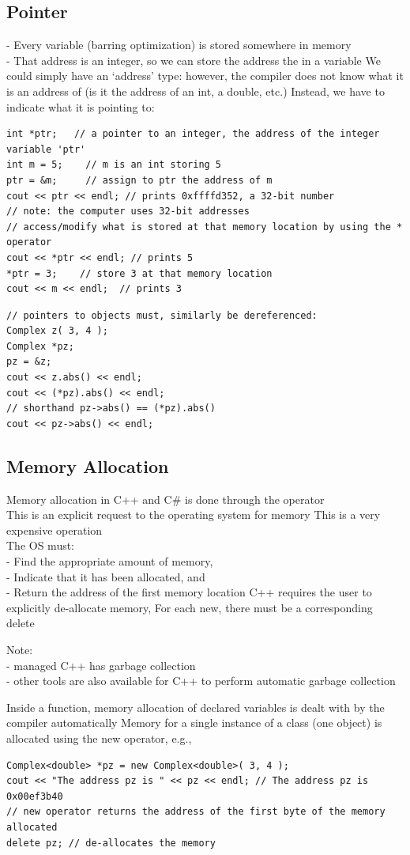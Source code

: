\documentclass[11pt]{article}
\theoremstyle{definition}
\begin{document}
\subsection{Pointer}
- Every variable (barring optimization) is stored somewhere in memory\\
- That address is an integer, so we can store the address the in a variable
\newline
We could simply have an ‘address’ type:  however, the compiler does not know what it is an address of (is it the address of an int, a double, etc.)
Instead, we have to indicate what it is pointing to:
\begin{lstlisting}
int *ptr;   // a pointer to an integer, the address of the integer variable 'ptr'
int m = 5;    // m is an int storing 5
ptr = &m;     // assign to ptr the address of m
cout << ptr << endl; //	prints 0xffffd352, a 32-bit number
// note: the computer uses 32-bit addresses
// access/modify what is stored at that memory location by using the * operator
cout << *ptr << endl; // prints 5
*ptr = 3;    // store 3 at that memory location 
cout << m << endl;  // prints 3
\end{lstlisting}
\begin{lstlisting}
// pointers to objects must, similarly be dereferenced:
Complex z( 3, 4 );
Complex *pz;
pz = &z;
cout << z.abs() << endl;
cout << (*pz).abs() << endl;
// shorthand pz->abs() == (*pz).abs()
cout << pz->abs() << endl;
\end{lstlisting}
\subsection{Memory Allocation}
Memory allocation in C++ and C\# is done through the  operator\\
This is an explicit request to the operating system for memory
This is a very expensive operation\\
The OS must:\\
- Find the appropriate amount of memory,\\
- Indicate that it has been allocated, and\\
- Return the address of the first memory location
C++ requires the user to explicitly de-allocate memory, For each new, there must be a corresponding delete\\
\begin{shaded}
Note:\\
- managed C++ has garbage collection\\
- other tools are also available for C++ to perform automatic garbage collection
\end{shaded}
Inside a function, memory allocation of declared variables is dealt with by the compiler automatically
Memory for a single instance of a class (one object) is allocated using the new operator, e.g.,
\begin{lstlisting}
Complex<double> *pz = new Complex<double>( 3, 4 );
cout << "The address pz is " << pz << endl; // The address pz is 0x00ef3b40
// new operator returns the address of the first byte of the memory allocated 
delete pz; // de-allocates the memory
\end{lstlisting}
\end{document}
